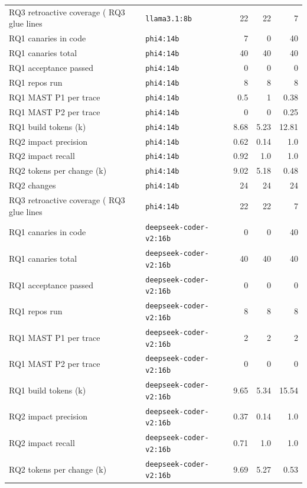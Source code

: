 \begin{tabular}{llrrr}
RQ3 retroactive coverage (%
RQ3 glue lines & \texttt{llama3.1:8b} & 22 & 22 & 7 \\
RQ1 canaries in code & \texttt{phi4:14b} & 7 & 0 & 40 \\
RQ1 canaries total & \texttt{phi4:14b} & 40 & 40 & 40 \\
RQ1 acceptance passed & \texttt{phi4:14b} & 0 & 0 & 0 \\
RQ1 repos run & \texttt{phi4:14b} & 8 & 8 & 8 \\
RQ1 MAST P1 per trace & \texttt{phi4:14b} & 0.5 & 1 & 0.38 \\
RQ1 MAST P2 per trace & \texttt{phi4:14b} & 0 & 0 & 0.25 \\
RQ1 build tokens (k) & \texttt{phi4:14b} & 8.68 & 5.23 & 12.81 \\
RQ2 impact precision & \texttt{phi4:14b} & 0.62 & 0.14 & 1.0 \\
RQ2 impact recall & \texttt{phi4:14b} & 0.92 & 1.0 & 1.0 \\
RQ2 tokens per change (k) & \texttt{phi4:14b} & 9.02 & 5.18 & 0.48 \\
RQ2 changes & \texttt{phi4:14b} & 24 & 24 & 24 \\
RQ3 retroactive coverage (%
RQ3 glue lines & \texttt{phi4:14b} & 22 & 22 & 7 \\
RQ1 canaries in code & \texttt{deepseek-coder-v2:16b} & 0 & 0 & 40 \\
RQ1 canaries total & \texttt{deepseek-coder-v2:16b} & 40 & 40 & 40 \\
RQ1 acceptance passed & \texttt{deepseek-coder-v2:16b} & 0 & 0 & 0 \\
RQ1 repos run & \texttt{deepseek-coder-v2:16b} & 8 & 8 & 8 \\
RQ1 MAST P1 per trace & \texttt{deepseek-coder-v2:16b} & 2 & 2 & 2 \\
RQ1 MAST P2 per trace & \texttt{deepseek-coder-v2:16b} & 0 & 0 & 0 \\
RQ1 build tokens (k) & \texttt{deepseek-coder-v2:16b} & 9.65 & 5.34 & 15.54 \\
RQ2 impact precision & \texttt{deepseek-coder-v2:16b} & 0.37 & 0.14 & 1.0 \\
RQ2 impact recall & \texttt{deepseek-coder-v2:16b} & 0.71 & 1.0 & 1.0 \\
RQ2 tokens per change (k) & \texttt{deepseek-coder-v2:16b} & 9.69 & 5.27 & 0.53 \\

\end{tabular}
